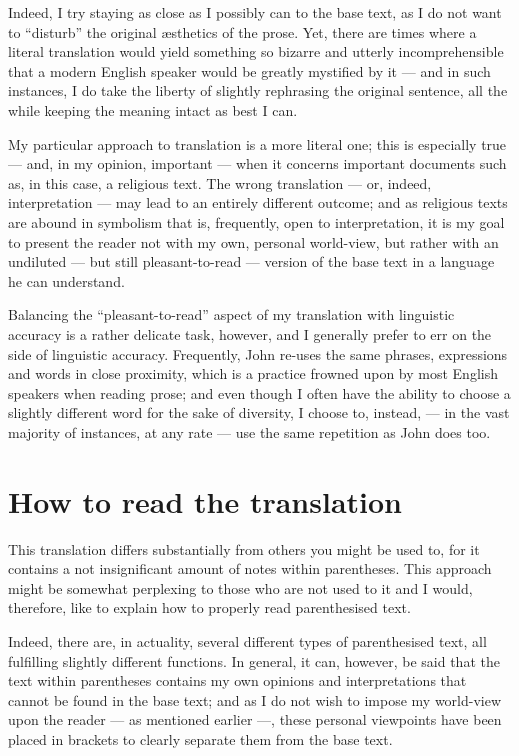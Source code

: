 Indeed, I try staying as close as I possibly can to the base text, as I do not want to ``disturb'' the original \ae sthetics of the prose. Yet, there are times where a literal translation would yield something so bizarre and utterly incomprehensible that a modern English speaker would be greatly mystified by it — and in such instances, I do take the liberty of slightly rephrasing the original sentence, all the while keeping the meaning intact as best I can. 

My particular approach to translation is a more literal one; this is especially true — and, in my opinion, important — when it concerns important documents such as, in this case, a religious text. The wrong translation — or, indeed, interpretation — may lead to an entirely different outcome; and as religious texts are abound in symbolism that is, frequently, open to interpretation, it is my goal to present the reader not with my own, personal world-view, but rather with an undiluted — but still pleasant-to-read — version of the base text in a language he can understand.  

Balancing the ``pleasant-to-read'' aspect of my translation with linguistic accuracy is a rather delicate task, however, and I generally prefer to err on the side of linguistic accuracy. Frequently, John re-uses the same phrases, expressions and words in close proximity, which is a practice frowned upon by most English speakers when reading prose; and even though I often have the ability to choose a slightly different word for the sake of diversity, I choose to, instead, — in the vast majority of instances, at any rate — use the same repetition as John does too. 

\section*{How to read the translation}
  
This translation differs substantially from others you might be used to, for it contains a not insignificant amount of notes within parentheses. This approach might be somewhat perplexing to those who are not used to it and I would, therefore, like to explain how to properly read parenthesised text.  

Indeed, there are, in actuality, several different types of parenthesised text, all fulfilling slightly different functions. In general, it can, however, be said that the text within parentheses contains my own opinions and interpretations that cannot be found in the base text; and as I do not wish to impose my world-view upon the reader — as mentioned earlier —, these personal viewpoints have been placed in brackets to clearly separate them from the base text. 

